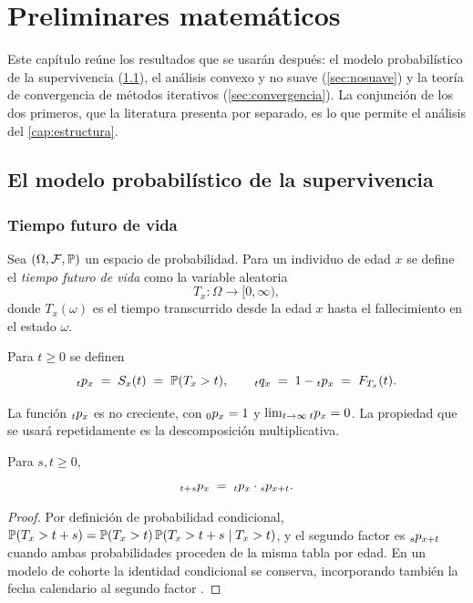 \chapter{Preliminares matemáticos}
\label{cap:preliminares}

Este capítulo reúne los resultados que se usarán después: el modelo probabilístico
de la supervivencia (\cref{sec:prob}), el análisis convexo y no suave
(\cref{sec:nosuave}) y la teoría de convergencia de métodos iterativos
(\cref{sec:convergencia}). La conjunción de los dos primeros, que la literatura
presenta por separado, es lo que permite el análisis del \cref{cap:estructura}.

\section{El modelo probabilístico de la supervivencia}
\label{sec:prob}

\subsection{Tiempo futuro de vida}

\begin{definition}
Sea $(\Omega,\mathcal{F},\mathbb{P})$ un espacio de probabilidad. Para un individuo de
edad $x$ se define el \emph{tiempo futuro de vida} como la variable aleatoria
\[
  T_x:\Omega\longrightarrow[0,\infty),
\]
donde $T_x(\omega)$ es el tiempo transcurrido desde la edad $x$ hasta el
fallecimiento en el estado $\omega$.
\end{definition}

\begin{definition}
Para $t\ge 0$ se definen
\[
  {}_{t}p_{x} \;=\; S_x(t) \;=\; \mathbb{P}(T_x>t),
  \qquad
  {}_{t}q_{x} \;=\; 1-{}_{t}p_{x} \;=\; F_{T_x}(t).
\]
\end{definition}

La función ${}_{t}p_{x}$ es no creciente, con ${}_{0}p_{x}=1$ y
$\lim_{t\to\infty}{}_{t}p_{x}=0$. La propiedad que se usará repetidamente es la
descomposición multiplicativa.

\begin{lemma}
\label{lem:descomposicion}
Para $s,t\ge0$,
\[
  {}_{t+s}p_{x} \;=\; {}_{t}p_{x}\cdot {}_{s}p_{x+t}.
\]
\end{lemma}
\begin{proof}
Por definición de probabilidad condicional,
$\mathbb{P}(T_x>t+s)=\mathbb{P}(T_x>t)\,\mathbb{P}(T_x>t+s \mid T_x>t)$, y el segundo factor es
${}_{s}p_{x+t}$ cuando ambas probabilidades proceden de la misma tabla por edad.
En un modelo de cohorte la identidad condicional se conserva, incorporando
también la fecha calendario al segundo factor \citep{pitacco2009}.
\end{proof}

